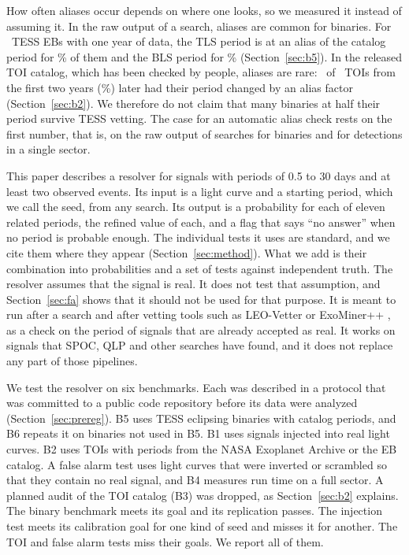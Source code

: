 \documentclass[twocolumn,linenumbers]{aastex701}
\begin{document}
How often aliases occur depends on where one looks, so we measured it instead of assuming it. In the raw output of a search, aliases are common for binaries. For \bFiveN\ TESS EBs with one year of data, the TLS period is at an alias of the catalog period for \bFiveAliasTlsPc\% of them and the BLS period for \bFiveAliasBlsPc\% (Section~\ref{sec:b5}). In the released TOI catalog, which has been checked by people, aliases are rare: \revAlias\ of \revBoth\ TOIs from the first two years (\revAliasPc\%) later had their period changed by an alias factor (Section~\ref{sec:b2}). We therefore do not claim that many binaries at half their period survive TESS vetting. The case for an automatic alias check rests on the first number, that is, on the raw output of searches for binaries and for detections in a single sector.

This paper describes a resolver for signals with periods of 0.5 to 30 days and at least two observed events. Its input is a light curve and a starting period, which we call the seed, from any search. Its output is a probability for each of eleven related periods, the refined value of each, and a flag that says ``no answer'' when no period is probable enough. The individual tests it uses are standard, and we cite them where they appear (Section~\ref{sec:method}). What we add is their combination into probabilities and a set of tests against independent truth. The resolver assumes that the signal is real. It does not test that assumption, and Section~\ref{sec:fa} shows that it should not be used for that purpose. It is meant to run after a search and after vetting tools such as LEO-Vetter \citep{Kunimoto2025leo} or ExoMiner++ \citep{Valizadegan2025}, as a check on the period of signals that are already accepted as real. It works on signals that SPOC, QLP and other searches have found, and it does not replace any part of those pipelines.

We test the resolver on six benchmarks. Each was described in a protocol that was committed to a public code repository before its data were analyzed (Section~\ref{sec:prereg}). B5 uses TESS eclipsing binaries with catalog periods, and B6 repeats it on binaries not used in B5. B1 uses signals injected into real light curves. B2 uses TOIs with periods from the NASA Exoplanet Archive or the EB catalog. A false alarm test uses light curves that were inverted or scrambled so that they contain no real signal, and B4 measures run time on a full sector. A planned audit of the TOI catalog (B3) was dropped, as Section~\ref{sec:b2} explains. The binary benchmark meets its goal and its replication passes. The injection test meets its calibration goal for one kind of seed and misses it for another. The TOI and false alarm tests miss their goals. We report all of them.
\end{document}

